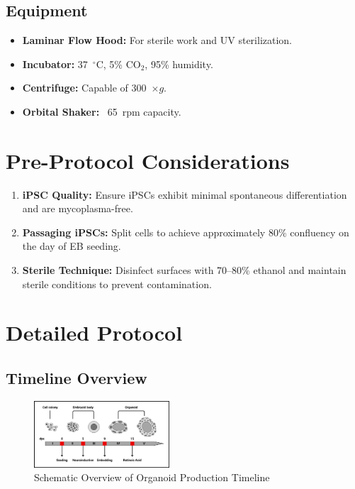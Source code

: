 \documentclass[11pt]{article}
\begin{document}
\subsection{Equipment}
\begin{itemize}[leftmargin=*]
    \item \textbf{Laminar Flow Hood:} For sterile work and UV sterilization.
    \item \textbf{Incubator:} 37~$^\circ$C, 5\% CO$_2$, 95\% humidity.
    \item \textbf{Centrifuge:} Capable of 300~$\times g$.
    \item \textbf{Orbital Shaker:} ~65~rpm capacity.
\end{itemize}

\section{Pre-Protocol Considerations}

\begin{enumerate}[leftmargin=*]
    \item \textbf{iPSC Quality:} Ensure iPSCs exhibit minimal spontaneous differentiation and are mycoplasma-free.
    \item \textbf{Passaging iPSCs:} Split cells to achieve approximately 80\% confluency on the day of EB seeding.
    \item \textbf{Sterile Technique:} Disinfect surfaces with 70–80\% ethanol and maintain sterile conditions to prevent contamination.
\end{enumerate}

\section{Detailed Protocol}

\subsection{Timeline Overview}
\begin{figure}[H]
    \centering
    \includegraphics[width=0.45\textwidth]{lab manual timeline-2.png}
    \caption{Schematic Overview of Organoid Production Timeline}
    \label{fig:timeline}
\end{figure}
\end{document}
